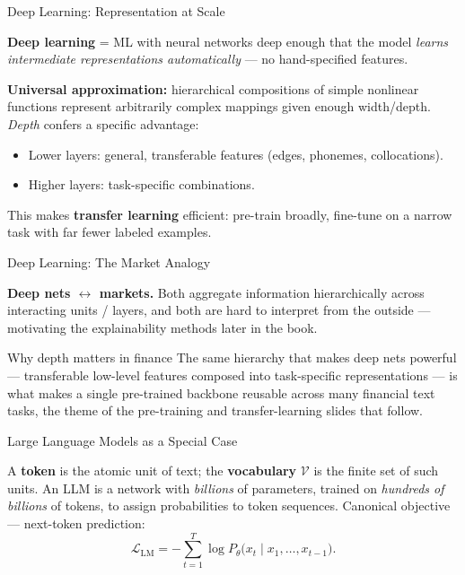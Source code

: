 \documentclass[9pt,t]{beamer}
\begin{document}
\begin{frame}{Deep Learning: Representation at Scale}

\textbf{Deep learning} = ML with neural networks deep enough that the model
\emph{learns intermediate representations automatically} --- no hand-specified features.

\medskip
\begin{underhood}
\textbf{Universal approximation:} hierarchical compositions of simple nonlinear
functions represent arbitrarily complex mappings given enough width/depth.
\emph{Depth} confers a specific advantage:
\begin{itemize}
  \item Lower layers: general, transferable features (edges, phonemes, collocations).
  \item Higher layers: task-specific combinations.
\end{itemize}
This makes \textbf{transfer learning} efficient: pre-train broadly, fine-tune on
a narrow task with far fewer labeled examples.
\end{underhood}
\end{frame}

\begin{frame}{Deep Learning: The Market Analogy}

\begin{bigpicture}
\textbf{Deep nets $\leftrightarrow$ markets.} Both aggregate information
hierarchically across interacting units / layers, and both are hard to interpret
from the outside --- motivating the explainability methods later in the book.
\end{bigpicture}

\medskip
\begin{block}{Why depth matters in finance}
The same hierarchy that makes deep nets powerful --- transferable low-level
features composed into task-specific representations --- is what makes a single
pre-trained backbone reusable across many financial text tasks, the theme of the
pre-training and transfer-learning slides that follow.
\end{block}
\end{frame}

\begin{frame}{Large Language Models as a Special Case}

\begin{underhood}
A \textbf{token} is the atomic unit of text; the \textbf{vocabulary}
$\mathcal{V}$ is the finite set of such units. An LLM is a network with
\emph{billions} of parameters, trained on \emph{hundreds of billions} of tokens,
to assign probabilities to token sequences. Canonical objective --- next-token prediction:
\[
  \mathcal{L}_{\mathrm{LM}} = -\sum_{t=1}^{T}\log P_\theta\big(x_t \mid x_1,\dots,x_{t-1}\big).
\]
\end{underhood}
\end{frame}
\end{document}
